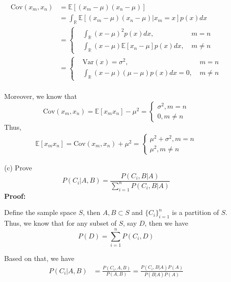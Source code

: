\documentclass{article}
\newcommand{\E}{\mathbb{E}}
\newcommand{\Var}{\mathrm{Var}}
\newcommand{\Cov}{\mathrm{Cov}}
\begin{document}
\begin{enumerate}
\begin{enumerate}
\begin{align*}
            \Cov(x_m,x_n)&=\E[(x_m-\mu)(x_n-\mu)]\\
            &=\int_{\mathbb{R}}\E[(x_m-\mu)(x_n-\mu)|x_m=x]p(x)dx\\
            &=\left\{
                \begin{aligned}
                    &\int_{\mathbb{R}}(x-\mu)^2p(x)dx,\ &m=n \\
                    &\int_{\mathbb{R}}(x-\mu)\E[x_n-\mu]p(x)dx,\ &m\neq n
                \end{aligned}
            \right.\\
            &=\left\{
                \begin{aligned}
                    &\Var(x)=\sigma^2,\ &m=n \\
                    &\int_{\mathbb{R}}(x-\mu)(\mu-\mu)p(x)dx=0,\ &m\neq n
                \end{aligned}
            \right.\\
        \end{align*}
        \par Moreover, we know that 
        \[\Cov(x_m, x_n)=\E[x_mx_n]-\mu^2=\left\{
            \begin{aligned}
                \sigma^2, m=n\\
                0, m\neq n
            \end{aligned}
        \right.\] 
        Thus, \begin{align*}
            \E[x_mx_n]=\Cov(x_m,x_n)+\mu^2=\left\{
                \begin{aligned}
                    \mu^2+\sigma^2, m=n\\
                    \mu^2, m\neq n
                \end{aligned}
            \right.
        \end{align*}
        \item[(c)] Prove
        \[P(C_i|A,B)=\frac{P(C_i,B|A)}{\sum_{i=1}^n P(C_i,B|A)}\]\newline
        {\bf Proof:}\par
        Define the sample space $S$, then $A,B\subset S$ and $\{C_i\}_{i=1}^n$ is a partition of $S$. Thus, we know that for any subset of $S$, say $D$, then we have
        \[P(D) = \sum_{i=1}^n P(C_i,D)\]
        \par Based on that, we have
        \begin{align*}
            P(C_i|A,B)&=\frac{P(C_i,A,B)}{P(A,B)}=\frac{P(C_i,B|A)P(A)}{P(B|A)P(A)}\\

\end{align*}
\end{enumerate}
\end{enumerate}
\end{document}
